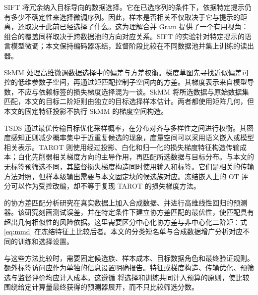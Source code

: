 SIFT 将冗余纳入目标导向的数据选择\citep{hubotter2025sift}。它在已选序列的条件下，依据特定提示仍有多少不确定性来选择微调序列。因此，样本是否相关不仅取决于它与提示的距离，还取决于此前已经选择了什么。这为理解合并 Gram 提供了一个有用视角：组合的覆盖同样取决于跨数据池的方向对应关系。SIFT 的实验针对特定提示的语言模型微调；本文保持编码器冻结，监督阶段比较在不同数据池并集上训练的读出器。

SkMM 处理高维微调数据选择中的偏差与方差权衡\citep{dong2024skmm}。梯度草图先寻找近似偏差可控的低维参数子空间，再通过矩匹配控制子空间内的方差。其梯度表示来自模型导数，不应与依赖标签的损失梯度选择混为一谈。SkMM 将所选数据与原始数据集匹配，本文的目标二阶矩则由独立的目标选择样本估计。两者都使用矩阵几何，但本文的固定特征投影不执行 SkMM 的梯度空间构造。

TSDS 通过最优传输目标优化采样概率，在分布对齐与多样性之间进行权衡\citep{liu2024tsds}。其密度感知正则减少概率集中于近重复候选的现象，度量空间可以采用语义嵌入或模型相关表示。TAROT 则使用经过投影、白化和归一化的损失梯度特征构造传输成本\citep{feng2025tarot}；白化先削弱相关梯度方向的主导作用，再匹配所选数据与目标分布。与本文的无标签预筛选不同，其监督损失梯度构造同时使用输入和标签。它们是相关的传输方法对照，但样本级输出需要与本文固定块的候选族对应。冻结嵌入上的 OT 评分可以作为受控改编，却不等于复现 TAROT 的损失梯度方法。

\citet{rezaei2026synthetic} 的协方差匹配分析研究在真实数据上加入合成数据、并进行高维线性回归的预测器。该研究刻画测试误差，并在特定条件下建立协方差匹配的最优性，使匹配具有超出几何相似性的风险依据。这里需要区分中心化协方差与非中心化二阶矩：式\eqref{eq:mmd} 在冻结特征上比较后者。本文的分类短名单与合成数据增广分析对应不同的训练和选择设置。

与这些方法比较时，需要固定候选族、样本成本、目标数据角色和最终验证规则。额外标签访问应作为单独的信息设置明确报告。特征或梯度构造、传输优化、预筛选与监督评价均应计入成本。这遵循\citet{yin2025} 将选择和训练共同计入预算的原则，使比较围绕给定计算量最终获得的预测器展开，而不只比较筛选分数。
